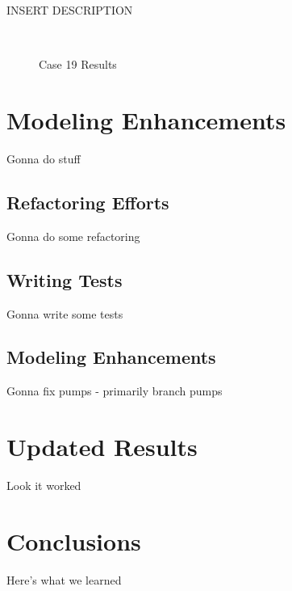 \documentclass{report}
\begin{document}
      INSERT DESCRIPTION

      \begin{figure*}[hbt]
        \centering
        ~
        \caption{Case 19 Results}
      \end{figure*}

  \chapter{Modeling Enhancements}\label{ch:enhancements}

    Gonna do stuff

    \section{Refactoring Efforts}\label{sec:enhancements-refactor}

      Gonna do some refactoring

    \section{Writing Tests}\label{sec:enhancements-tests}

      Gonna write some tests

    \section{Modeling Enhancements}\label{sec:enhancements-fixes}

      Gonna fix pumps - primarily branch pumps

  \chapter{Updated Results}\label{ch:newresults}

    Look it worked

  \chapter{Conclusions}\label{ch:conclusions}

    Here's what we learned
\end{document}
